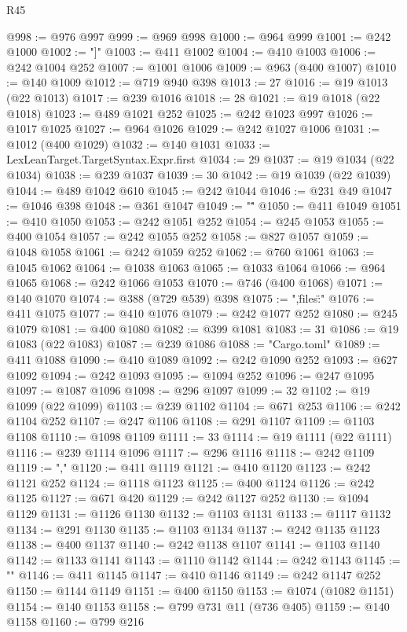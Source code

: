 \begin{lexlean}{R45}
\begin{coremodule}
@998 := @976 @997
@999 := @969 @998
@1000 := @964 @999
@1001 := @242 @1000
@1002 := "]"
@1003 := @411 @1002
@1004 := @410 @1003
@1006 := @242 @1004 @252
@1007 := @1001 @1006
@1009 := @963 (@400 @1007)
@1010 := @140 @1009
@1012 := @719 @940 @398
@1013 := 27
@1016 := @19 @1013 (@22 @1013)
@1017 := @239 @1016
@1018 := 28
@1021 := @19 @1018 (@22 @1018)
@1023 := @489 @1021 @252
@1025 := @242 @1023 @997
@1026 := @1017 @1025
@1027 := @964 @1026
@1029 := @242 @1027 @1006
@1031 := @1012 (@400 @1029)
@1032 := @140 @1031
@1033 := LexLeanTarget.TargetSyntax.Expr.first
@1034 := 29
@1037 := @19 @1034 (@22 @1034)
@1038 := @239 @1037
@1039 := 30
@1042 := @19 @1039 (@22 @1039)
@1044 := @489 @1042 @610
@1045 := @242 @1044
@1046 := @231 @49
@1047 := @1046 @398
@1048 := @361 @1047
@1049 := "\""
@1050 := @411 @1049
@1051 := @410 @1050
@1053 := @242 @1051 @252
@1054 := @245 @1053
@1055 := @400 @1054
@1057 := @242 @1055 @252
@1058 := @827 @1057
@1059 := @1048 @1058
@1061 := @242 @1059 @252
@1062 := @760 @1061
@1063 := @1045 @1062
@1064 := @1038 @1063
@1065 := @1033 @1064
@1066 := @964 @1065
@1068 := @242 @1066 @1053
@1070 := @746 (@400 @1068)
@1071 := @140 @1070
@1074 := @388 (@729 @539) @398
@1075 := ",\"files\":{"
@1076 := @411 @1075
@1077 := @410 @1076
@1079 := @242 @1077 @252
@1080 := @245 @1079
@1081 := @400 @1080
@1082 := @399 @1081
@1083 := 31
@1086 := @19 @1083 (@22 @1083)
@1087 := @239 @1086
@1088 := "Cargo.toml"
@1089 := @411 @1088
@1090 := @410 @1089
@1092 := @242 @1090 @252
@1093 := @627 @1092
@1094 := @242 @1093
@1095 := @1094 @252
@1096 := @247 @1095
@1097 := @1087 @1096
@1098 := @296 @1097
@1099 := 32
@1102 := @19 @1099 (@22 @1099)
@1103 := @239 @1102
@1104 := @671 @253
@1106 := @242 @1104 @252
@1107 := @247 @1106
@1108 := @291 @1107
@1109 := @1103 @1108
@1110 := @1098 @1109
@1111 := 33
@1114 := @19 @1111 (@22 @1111)
@1116 := @239 @1114 @1096
@1117 := @296 @1116
@1118 := @242 @1109
@1119 := ","
@1120 := @411 @1119
@1121 := @410 @1120
@1123 := @242 @1121 @252
@1124 := @1118 @1123
@1125 := @400 @1124
@1126 := @242 @1125
@1127 := @671 @420
@1129 := @242 @1127 @252
@1130 := @1094 @1129
@1131 := @1126 @1130
@1132 := @1103 @1131
@1133 := @1117 @1132
@1134 := @291 @1130
@1135 := @1103 @1134
@1137 := @242 @1135 @1123
@1138 := @400 @1137
@1140 := @242 @1138 @1107
@1141 := @1103 @1140
@1142 := @1133 @1141
@1143 := @1110 @1142
@1144 := @242 @1143
@1145 := "}"
@1146 := @411 @1145
@1147 := @410 @1146
@1149 := @242 @1147 @252
@1150 := @1144 @1149
@1151 := @400 @1150
@1153 := @1074 (@1082 @1151)
@1154 := @140 @1153
@1158 := @799 @731 @11 (@736 @405)
@1159 := @140 @1158
@1160 := @799 @216

\end{coremodule}
\end{lexlean}
